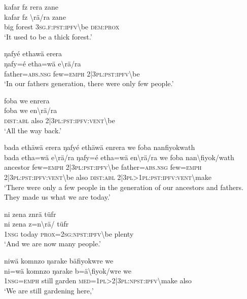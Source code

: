 \ea\label{ex:2:a1676}
kafar fz rera zane\\
\gll kafar	fz	{\textbackslash}rä/ra	zane\\
     big	forest	3\textsc{sg}.\textsc{f}:\textsc{pst}:\textsc{ipfv}{\textbackslash}be	\textsc{dem}:\textsc{prox}\\
\glt `It used to be a thick forest.'
\z

\ea\label{ex:2:a1677}
ŋafyé ethawä erera\\
\gll ŋafy=é	etha=wä	e{\textbackslash}rä/ra\\
     father=\textsc{abs}.\textsc{nsg}	few=\textsc{emph}	2|3\textsc{pl}:\textsc{pst}:\textsc{ipfv}{\textbackslash}be\\
\glt `In our fathers generation, there were only few people.'
\z

\ea\label{ex:2:a1678}
foba we enrera\\
\gll foba	we	en{\textbackslash}rä/ra\\
     \textsc{dist}:\textsc{abl}	also	2|3\textsc{pl}:\textsc{pst}:\textsc{ipfv}:\textsc{vent}{\textbackslash}be\\
\glt `All the way back.'
\z

\ea\label{ex:2:a1680}
bada ethäwä erera ŋafyé ethäwä enrera we foba nanfiyokwath\\
\gll bada	etha=wä	e{\textbackslash}rä/ra	ŋafy=é	etha=wä	en{\textbackslash}rä/ra	we	foba	nan{\textbackslash}fiyok/wath\\
     ancestor	few=\textsc{emph}	2|3\textsc{pl}:\textsc{pst}:\textsc{ipfv}{\textbackslash}be	father=\textsc{abs}.\textsc{nsg}	few=\textsc{emph}	2|3\textsc{pl}:\textsc{pst}:\textsc{ipfv}:\textsc{vent}{\textbackslash}be	also	\textsc{dist}:\textsc{abl}	2|3\textsc{pl}>1\textsc{pl}:\textsc{pst}:\textsc{ipfv}:\textsc{vent}{\textbackslash}make\\
\glt `There were only a few people in the generation of our ancestors and fathers. They made us what we are today.'
\z

\ea\label{ex:2:a1681}
ni zena znrä tüfr\\
\gll ni	zena	z=n{\textbackslash}rä/	tüfr\\
     1\textsc{nsg}	today	\textsc{prox}=2\textsc{sg}:\textsc{npst}:\textsc{ipfv}{\textbackslash}be	plenty\\
\glt `And we are now many people.'
\z

\newpage
\ea\label{ex:2:a1682}
niwä komnzo ŋarake bäfiyokwre we\\
\gll ni=wä	komnzo	ŋarake	b=ä{\textbackslash}fiyok/wre	we\\
     1\textsc{nsg}=\textsc{emph}	still	garden	\textsc{med}=1\textsc{pl}>2|3\textsc{pl}:\textsc{npst}:\textsc{ipfv}{\textbackslash}make	also\\
\glt `We are still gardening here,'
\z

